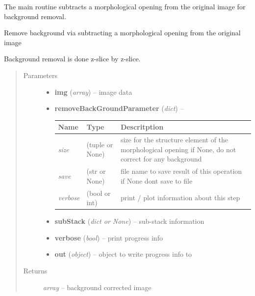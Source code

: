 \documentclass[letterpaper,10pt,english]{sphinxmanual}
\begin{document}
The main routine subtracts a morphological opening from the original image
for background removal.

\begin{fulllineitems}
\label{api/ClearMap.ImageProcessing:ClearMap.ImageProcessing.BackgroundRemoval.removeBackground}
Remove background via subtracting a morphological opening from the original image

Background removal is done z-slice by z-slice.
\begin{quote}\begin{description}
\item[{Parameters}] \leavevmode\begin{itemize}
\item {} 
\textbf{img} (\emph{array}) --
image data

\item {} 
\textbf{removeBackGroundParameter} (\emph{dict}) --

\begin{tabulary}{\linewidth}{|L|L|L|}
\hline
\textsf{\relax 
Name
} & \textsf{\relax 
Type
} & \textsf{\relax 
Descritption
}\\
\hline
\emph{size}
 & 
(tuple or None)
 & 
size for the structure element of the morphological opening
if None, do not correct for any background
\\
\hline
\emph{save}
 & 
(str or None)
 & 
file name to save result of this operation
if None dont save to file
\\
\hline
\emph{verbose}
 & 
(bool or int)
 & 
print / plot information about this step
\\
\hline\end{tabulary}


\item {} 
\textbf{subStack} (\emph{dict or None}) --
sub-stack information

\item {} 
\textbf{verbose} (\emph{bool}) --
print progress info

\item {} 
\textbf{out} (\emph{object}) --
object to write progress info to

\end{itemize}

\item[{Returns}] \leavevmode
\emph{array} --
background corrected image

\end{description}\end{quote}

\end{fulllineitems}
\end{document}
